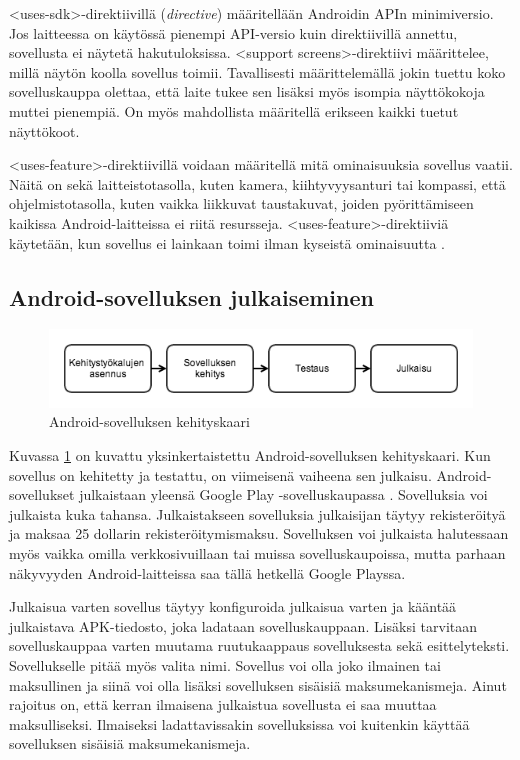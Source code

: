 <uses-sdk>-direktiivillä (\emph{directive}) määritellään Androidin APIn minimiversio. Jos laitteessa on käytössä pienempi API-versio kuin direktiivillä annettu, sovellusta ei näytetä hakutuloksissa. <support screens>-direktiivi määrittelee, millä näytön koolla sovellus toimii. Tavallisesti määrittelemällä jokin tuettu koko sovelluskauppa olettaa, että laite tukee sen lisäksi myös isompia näyttökokoja muttei pienempiä. On myös mahdollista määritellä erikseen kaikki tuetut näyttökoot.

<uses-feature>-direktiivillä voidaan määritellä mitä ominaisuuksia sovellus vaatii. Näitä on sekä laitteistotasolla, kuten kamera, kiihtyvyysanturi tai kompassi, että ohjelmistotasolla, kuten vaikka liikkuvat taustakuvat, joiden pyörittämiseen kaikissa Android-laitteissa ei riitä resursseja. <uses-feature>-direktiiviä käytetään, kun sovellus ei lainkaan toimi ilman kyseistä ominaisuutta \cite{android_compatibility}.

\subsection{Android-sovelluksen julkaiseminen}

\begin{figure}[h]
\centering
\includegraphics[width=130mm]{kehityskaari.png}
\caption{Android-sovelluksen kehityskaari \protect\cite{android}} \label{publishing_overview}
\end{figure}

Kuvassa \ref{publishing_overview} on kuvattu yksinkertaistettu Android-sovelluksen kehityskaari. Kun sovellus on kehitetty ja testattu, on viimeisenä vaiheena sen julkaisu. Android-sovellukset julkaistaan yleensä Google Play -sovelluskaupassa \cite{google_play}. Sovelluksia voi julkaista kuka tahansa. Julkaistakseen sovelluksia julkaisijan täytyy rekisteröityä ja maksaa 25 dollarin rekisteröitymismaksu. Sovelluksen voi julkaista halutessaan myös vaikka omilla verkkosivuillaan tai muissa sovelluskaupoissa, mutta parhaan näkyvyyden Android-laitteissa saa tällä hetkellä Google Playssa.

Julkaisua varten sovellus täytyy konfiguroida julkaisua varten ja kääntää julkaistava APK-tiedosto, joka ladataan sovelluskauppaan. Lisäksi tarvitaan sovelluskauppaa varten muutama ruutukaappaus sovelluksesta sekä esittelyteksti. Sovellukselle pitää myös valita nimi. Sovellus voi olla joko ilmainen tai maksullinen ja siinä voi olla lisäksi sovelluksen sisäisiä maksumekanismeja. Ainut rajoitus on, että kerran ilmaisena julkaistua sovellusta ei saa muuttaa maksulliseksi. Ilmaiseksi ladattavissakin sovelluksissa voi kuitenkin käyttää sovelluksen sisäisiä maksumekanismeja.

